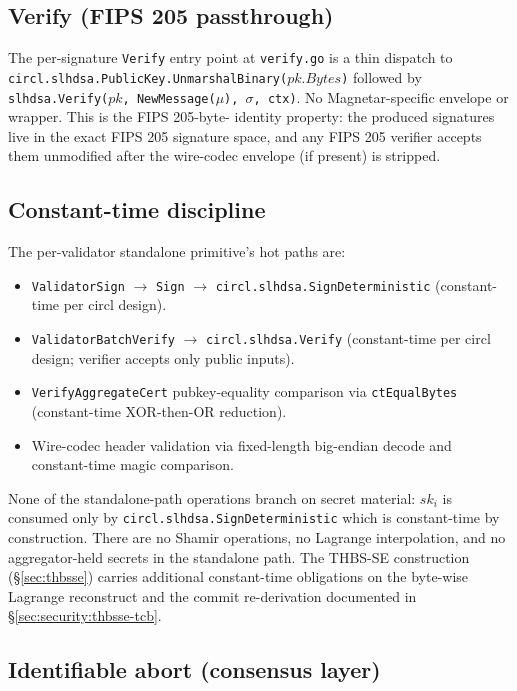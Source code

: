 \subsection{Verify (FIPS 205 passthrough)}
\label{sec:construction:verify}

The per-signature \texttt{Verify} entry point at \texttt{verify.go}
is a thin dispatch to
\texttt{circl.slhdsa.PublicKey.UnmarshalBinary($pk.Bytes$)} followed
by
\texttt{slhdsa.Verify($pk$, NewMessage($\mu$), $\sigma$, ctx)}. No
Magnetar-specific envelope or wrapper. This is the FIPS 205-byte-
identity property: the produced signatures live in the exact FIPS
205 signature space, and any FIPS 205 verifier accepts them
unmodified after the wire-codec envelope (if present) is stripped.

\subsection{Constant-time discipline}
\label{sec:construction:ct}

The per-validator standalone primitive's hot paths are:
\begin{itemize}[leftmargin=2em,nosep]
  \item \texttt{ValidatorSign} $\to$ \texttt{Sign} $\to$
        \texttt{circl.slhdsa.SignDeterministic} (constant-time per
        circl design).
  \item \texttt{ValidatorBatchVerify} $\to$
        \texttt{circl.slhdsa.Verify} (constant-time per circl
        design; verifier accepts only public inputs).
  \item \texttt{VerifyAggregateCert} pubkey-equality comparison
        via \texttt{ctEqualBytes} (constant-time XOR-then-OR
        reduction).
  \item Wire-codec header validation via fixed-length big-endian
        decode and constant-time magic comparison.
\end{itemize}
None of the standalone-path operations branch on secret material:
$sk_i$ is consumed only by \texttt{circl.slhdsa.SignDeterministic}
which is constant-time by construction. There are no Shamir
operations, no Lagrange interpolation, and no aggregator-held
secrets in the standalone path. The THBS-SE construction
(\S\ref{sec:thbsse}) carries additional constant-time obligations
on the byte-wise Lagrange reconstruct and the commit re-derivation
documented in \S\ref{sec:security:thbsse-tcb}.

\subsection{Identifiable abort (consensus layer)}
\label{sec:construction:abort}

